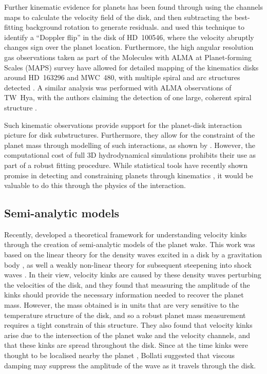 Further kinematic evidence for planets has been found through using the channels maps to calculate the velocity field of the disk, and then subtracting the best-fitting background rotation to generate residuals.
\citet{casassus2019} and \citet{perez2020} used this technique to identify a ``Doppler flip'' in the disk of HD~100546, where the velocity abruptly changes sign over the planet location.
Furthermore, the high angular resolution gas observations taken as part of the Molecules with ALMA at Planet-forming Scales (MAPS) survey have allowed for detailed mapping of the kinematics disks around HD~163296 and MWC~480, with multiple spiral and arc structures detected \citep{teague2021}.
A similar analysis was performed with ALMA observations of TW~Hya, with the authors claiming the detection of one large, coherent spiral structure \citep{teague2022}.

Such kinematic observations provide support for the planet-disk interaction picture for disk substructures. Furthermore, they allow for the constraint of the planet mass through modelling of such interactions, as shown by \citet{pinte2018a,pinte2019}.
However, the computational cost of full 3D hydrodynamical simulations prohibits their use as part of a robust fitting procedure.
While statistical tools have recently shown promise in detecting and constraining planets through kinematics \citep{izquierdo2021,izquierdo2022}, it would be valuable to do this through the physics of the interaction.

\subsection{Semi-analytic models}

Recently, \citet{bollati2021a} developed a theoretical framework for understanding velocity kinks through the creation of semi-analytic models of the planet wake.
This work was based on the linear theory for the density waves excited in a disk by a gravitation body \citep{goldreich1980}, as well a weakly non-linear theory for subsequent steepening into shock waves \citep{goodman2001,rafikov2002a}.
In their view, velocity kinks are caused by these density waves perturbing the velocities of the disk, and they found that measuring the amplitude of the kinks should provide the necessary information needed to recover the planet mass.
However, the mass obtained is in units that are very sensitive to the temperature structure of the disk, and so a robust planet mass measurement requires a tight constrain of this structure.
They also found that velocity kinks arise due to the intersection of the planet wake and the velocity channels, and that these kinks are spread throughout the disk.
Since at the time kinks were thought to be localised nearby the planet \citep{pinte2018a,pinte2019,pinte2020}, Bollati suggested that viscous damping may suppress the amplitude of the wave as it travels through the disk.

